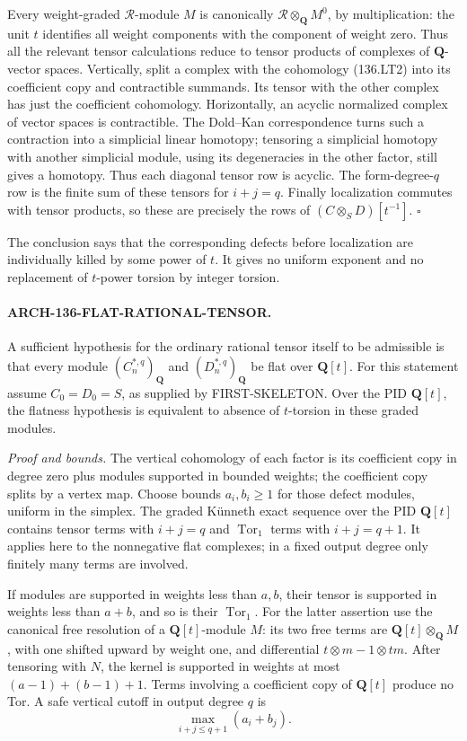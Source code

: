 Every weight-graded \(\mathcal R\)-module \(M\) is canonically
\(\mathcal R\otimes_{\mathbf Q}M^0\), by multiplication:
the unit \(t\) identifies all weight components with the component
of weight zero. Thus all the relevant tensor calculations reduce
to tensor products of complexes of \(\mathbf Q\)-vector spaces.
Vertically, split a complex with the cohomology (136.LT2) into
its coefficient copy and contractible summands. Its tensor with
the other complex has just the coefficient cohomology.
Horizontally, an acyclic normalized complex of vector spaces
is contractible. The Dold--Kan correspondence turns such a
contraction into a simplicial linear homotopy; tensoring a
simplicial homotopy with another simplicial module, using its
degeneracies in the other factor, still gives a homotopy.
Thus each diagonal tensor row is acyclic. The form-degree-\(q\)
row is the finite sum of these tensors for \(i+j=q\).
Finally localization commutes with tensor products, so these
are precisely the rows of
\((C\otimes_SD)[t^{-1}]\).
\hfill\(\square\)

The conclusion says that the corresponding defects before
localization are individually killed by some power of \(t\).
It gives no uniform exponent and no replacement of \(t\)-power
torsion by integer torsion.

\paragraph{ARCH-136-FLAT-RATIONAL-TENSOR.}
A sufficient hypothesis for the ordinary rational tensor itself
to be admissible is that every module
\((C_n^{*,q})_{\mathbf Q}\) and
\((D_n^{*,q})_{\mathbf Q}\) be flat over \(\mathbf Q[t]\).
For this statement assume \(C_0=D_0=S\), as supplied by
FIRST-SKELETON. Over the PID \(\mathbf Q[t]\), the flatness
hypothesis is equivalent to absence of \(t\)-torsion in these
graded modules.

\emph{Proof and bounds.}
The vertical cohomology of each factor is its coefficient copy
in degree zero plus modules supported in bounded weights; the
coefficient copy splits by a vertex map. Choose bounds
\(a_i,b_i\geq1\) for those defect modules, uniform in the simplex.
The graded K\"unneth exact sequence over the PID
\(\mathbf Q[t]\) contains tensor terms with \(i+j=q\) and
\(\operatorname{Tor}_1\) terms with \(i+j=q+1\).
It applies here to the nonnegative flat complexes; in a fixed
output degree only finitely many terms are involved.

If modules are supported in weights less than \(a,b\), their
tensor is supported in weights less than \(a+b\), and so is
their \(\operatorname{Tor}_1\). For the latter assertion use
the canonical free resolution of a \(\mathbf Q[t]\)-module \(M\):
its two free terms are
\(\mathbf Q[t]\otimes_{\mathbf Q}M\), with one shifted upward
by weight one, and differential \(t\otimes m-1\otimes tm\).
After tensoring with \(N\), the kernel is supported in weights
at most \((a-1)+(b-1)+1\).
Terms involving a coefficient copy of \(\mathbf Q[t]\) produce
no Tor. A safe vertical cutoff in output degree \(q\) is
\[
                  \max_{i+j\leq q+1}(a_i+b_j).
 \tag{136.LT3}
\]

